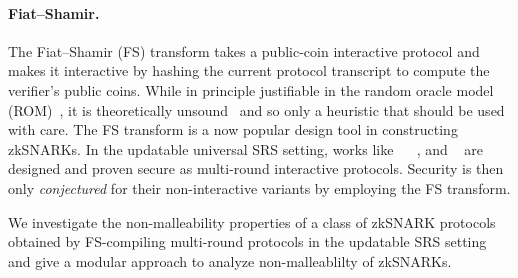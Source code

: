 \paragraph{Fiat--Shamir.}
The Fiat--Shamir (FS) transform takes a public-coin interactive protocol and
makes it interactive by hashing the current protocol transcript to compute the
verifier's public coins. While in principle justifiable in the random oracle
model (ROM)~\cite{CCS:BelRog93}, it is theoretically
unsound~\cite{FOCS:GolKal03} and so only a heuristic that should be used with
care.
%
The FS transform is a now popular design tool in constructing
zkSNARKs. In the updatable universal SRS setting, works like \sonic{}~\cite{CCS:MBKM19}
\plonk{}~\cite{EPRINT:GabWilCio19}, and \marlin~\cite{EC:CHMMVW20} are designed
and proven secure as multi-round interactive protocols. Security is then only
\emph{conjectured} for their non-interactive variants by employing the FS
transform.

We investigate the non-malleability properties of a class of zkSNARK protocols obtained by FS-compiling multi-round protocols in the updatable SRS setting and give a modular approach to analyze non-malleablilty of zkSNARKs.

